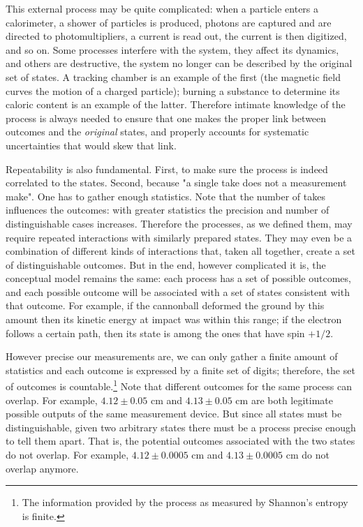 \documentclass[aps,pra,10pt,twocolumn,floatfix,nofootinbib]{revtex4-1}
\numberwithin{equation}{section}
\theoremstyle{definition}
\begin{document}
This external process may be quite complicated: when a particle enters a calorimeter, a shower of particles is produced, photons are captured and are directed to photomultipliers, a current is read out, the current is then digitized, and so on. Some processes interfere with the system, they affect its dynamics, and others are destructive, the system no longer can be described by the original set of states. A tracking chamber is an example of the first (the magnetic field curves the motion of a charged particle); burning a substance to determine its caloric content is an example of the latter. Therefore intimate knowledge of the process is always needed to ensure that one makes the proper link between outcomes and the \emph{original} states, and properly accounts for systematic uncertainties that would skew that link.

Repeatability is also fundamental. First, to make sure the process is indeed correlated to the states. Second, because "a single take does not a measurement make". One has to gather enough statistics. Note that the number of takes influences the outcomes: with greater statistics the precision and number of distinguishable cases increases. Therefore the processes, as we defined them, may require repeated interactions with similarly prepared states. They may even be a combination of different kinds of interactions that, taken all together, create a set of distinguishable outcomes. But in the end, however complicated it is, the conceptual model remains the same: each process has a set of possible outcomes, and each possible outcome will be associated with a set of states consistent with that outcome. For example, if the cannonball deformed the ground by this amount then its kinetic energy at impact was within this range; if the electron follows a certain path, then its state is among the ones that have spin $+1/2$.

However precise our measurements are, we can only gather a finite amount of statistics and each outcome is expressed by a finite set of digits; therefore, the set of outcomes is countable.\footnote{The information provided by the process as measured by Shannon's entropy is finite.} Note that different outcomes for the same process can overlap. For example, $4.12 \pm 0.05$ cm and $4.13 \pm 0.05$ cm are both legitimate possible outputs of the same measurement device. But since all states must be distinguishable, given two arbitrary states there must be a process precise enough to tell them apart. That is, the potential outcomes associated with the two states do not overlap. For example, $4.12 \pm 0.0005$ cm and $4.13 \pm 0.0005$ cm do not overlap anymore.
\end{document}
